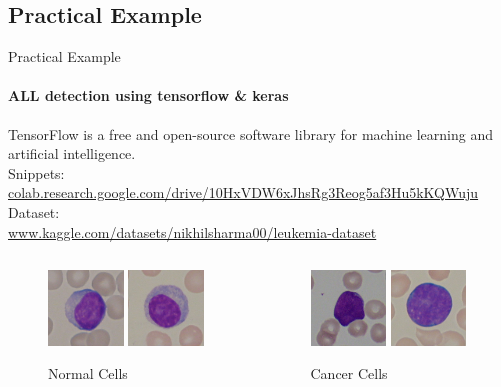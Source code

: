 \documentclass{beamer}
\begin{document}
    \subsection{Practical Example}
    \begin{frame}[t]{Practical Example}
      \framesubtitle{ALL detection using tensorflow \& keras}
      TensorFlow is a free and open-source software library for machine learning and artificial intelligence. \\
        Snippets:\\ \small\href{https://colab.research.google.com/drive/10HxVDW6xJhsRg3Reog5af3Hu5kKQWuju}{colab.research.google.com/drive/10HxVDW6xJhsRg3Reog5af3Hu5kKQWuju}
        Dataset:\\ \small\href{https://www.kaggle.com/datasets/nikhilsharma00/leukemia-dataset}{www.kaggle.com/datasets/nikhilsharma00/leukemia-dataset}
      \begin{columns}
        \begin{column}{0.5\textwidth}
          \begin{figure}
            \includegraphics[height=2cm]{resources/Im166_0}
            \includegraphics[height=2cm]{resources/Im196_0}
            \caption{Normal Cells}
          \end{figure}
        \end{column}
        \begin{column}{0.5\textwidth}
          \begin{figure}
            \includegraphics[height=2cm]{resources/Im063_1}
            \includegraphics[height=2cm]{resources/Im129_1}
            \caption{Cancer Cells}
          \end{figure}
        \end{column}
      \end{columns}
    \end{frame}
\end{document}

